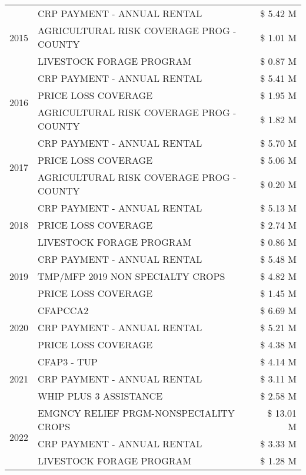 \begin{tabular}{llr}
\multirow[t]{3}{*}{2015} & CRP PAYMENT - ANNUAL RENTAL & \$ 5.42 M \\
 & AGRICULTURAL RISK COVERAGE PROG - COUNTY & \$ 1.01 M \\
 & LIVESTOCK FORAGE PROGRAM & \$ 0.87 M \\
\cline{1-3}
\multirow[t]{3}{*}{2016} & CRP PAYMENT - ANNUAL RENTAL & \$ 5.41 M \\
 & PRICE LOSS COVERAGE & \$ 1.95 M \\
 & AGRICULTURAL RISK COVERAGE PROG - COUNTY & \$ 1.82 M \\
\cline{1-3}
\multirow[t]{3}{*}{2017} & CRP PAYMENT - ANNUAL RENTAL & \$ 5.70 M \\
 & PRICE LOSS COVERAGE & \$ 5.06 M \\
 & AGRICULTURAL RISK COVERAGE PROG - COUNTY & \$ 0.20 M \\
\cline{1-3}
\multirow[t]{3}{*}{2018} & CRP PAYMENT - ANNUAL RENTAL & \$ 5.13 M \\
 & PRICE LOSS COVERAGE & \$ 2.74 M \\
 & LIVESTOCK FORAGE PROGRAM & \$ 0.86 M \\
\cline{1-3}
\multirow[t]{3}{*}{2019} & CRP PAYMENT - ANNUAL RENTAL & \$ 5.48 M \\
 & TMP/MFP 2019 NON SPECIALTY CROPS & \$ 4.82 M \\
 & PRICE LOSS COVERAGE & \$ 1.45 M \\
\cline{1-3}
\multirow[t]{3}{*}{2020} & CFAPCCA2 & \$ 6.69 M \\
 & CRP PAYMENT - ANNUAL RENTAL & \$ 5.21 M \\
 & PRICE LOSS COVERAGE & \$ 4.38 M \\
\cline{1-3}
\multirow[t]{3}{*}{2021} & CFAP3 - TUP & \$ 4.14 M \\
 & CRP PAYMENT - ANNUAL RENTAL & \$ 3.11 M \\
 & WHIP PLUS 3 ASSISTANCE & \$ 2.58 M \\
\cline{1-3}
\multirow[t]{3}{*}{2022} & EMGNCY RELIEF PRGM-NONSPECIALITY CROPS & \$ 13.01 M \\
 & CRP PAYMENT - ANNUAL RENTAL & \$ 3.33 M \\
 & LIVESTOCK FORAGE PROGRAM & \$ 1.28 M \\
\cline{1-3}
\bottomrule
\end{tabular}
